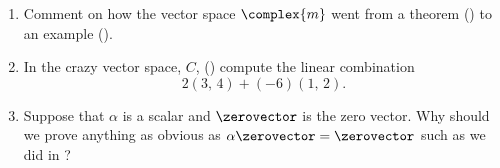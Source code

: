\begin{enumerate}
%
\item Comment on how the vector space $\complex{m}$ went from a theorem () to an example ().
%
\item In the crazy vector space, $C$, () compute the linear combination
%
\begin{equation*}
2(3,\,4)+(-6)(1,\,2).
\end{equation*}
%
\item Suppose that $\alpha$ is a scalar and $\zerovector$ is the zero vector. Why should we prove anything as obvious as $\alpha\zerovector=\zerovector$ such as we did in ?
%
\end{enumerate}